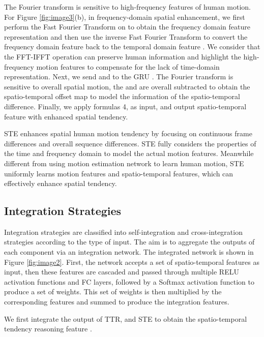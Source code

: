 \documentclass{bmvc2k}
\begin{document}
The Fourier transform is sensitive to high-frequency features of human motion. For Figure \ref{fig:image3}(b), in frequency-domain spatial enhancement, we first perform the Fast Fourier Transform on  to obtain the frequency domain feature representation and then use the inverse Fast Fourier Transform to convert the frequency domain feature back to the temporal domain feature . 
We consider that the FFT-IFFT operation can preserve human information and highlight the high-frequency motion features to compensate for the lack of time-domain representation.
Next, we send  and  to the GRU \cite{dey2017gate}. 
The Fourier transform is sensitive to overall spatial motion, the  and  are overall subtracted to obtain the spatio-temporal offset map  to model the information of the spatio-temporal difference.
Finally, we apply formulas 4,  as input, and output spatio-temporal feature  with enhanced spatial tendency.




STE enhances spatial human motion tendency by focusing on continuous frame differences and overall sequence differences. STE fully considers the properties of the time and frequency domain to model the actual motion features. Meanwhile different from using motion estimation network to learn human motion, STE uniformly learns motion features and spatio-temporal features, which can effectively enhance spatial tendency.


\subsection{Integration Strategies}
Integration strategies are classified into self-integration and cross-integration strategies according to the type of input. The aim is to aggregate the outputs of each component via an integration network.
The integrated network is shown in Figure \ref{fig:image2}. First, the network accepts a set of spatio-temporal features as input, then these features are cascaded and passed through multiple RELU activation functions and FC layers, followed by a Softmax activation function to produce a set of weights. This set of weights is then multiplied by the corresponding features and summed to produce the integration features.

We first integrate the output of TTR, and STE to obtain the spatio-temporal tendency reasoning feature . 
\end{document}
